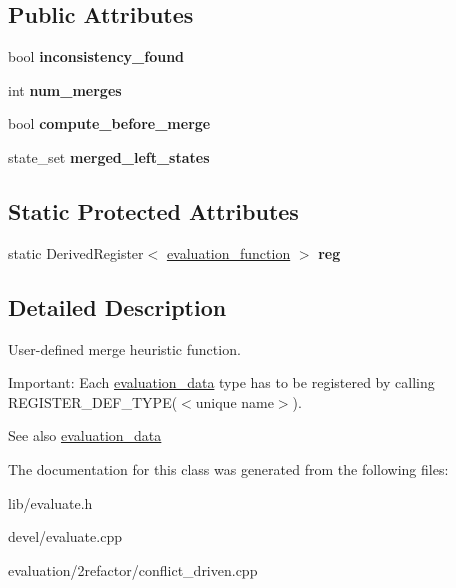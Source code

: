 \subsection*{Public Attributes}
\begin{DoxyCompactItemize}
\item 
bool {\bfseries inconsistency\+\_\+found}\hypertarget{classevaluation__function_a6631f0e603404c6c08c1a1fdd298932b}{}\label{classevaluation__function_a6631f0e603404c6c08c1a1fdd298932b}

\item 
int {\bfseries num\+\_\+merges}\hypertarget{classevaluation__function_a23fbdcc2f7a07e1d1428e61d5c5c267f}{}\label{classevaluation__function_a23fbdcc2f7a07e1d1428e61d5c5c267f}

\item 
bool {\bfseries compute\+\_\+before\+\_\+merge}\hypertarget{classevaluation__function_a1954a2b161d4da6148e288cb38ac8b59}{}\label{classevaluation__function_a1954a2b161d4da6148e288cb38ac8b59}

\item 
state\+\_\+set {\bfseries merged\+\_\+left\+\_\+states}\hypertarget{classevaluation__function_aff00baf1529b16519900b0f68afe8dad}{}\label{classevaluation__function_aff00baf1529b16519900b0f68afe8dad}

\end{DoxyCompactItemize}
\subsection*{Static Protected Attributes}
\begin{DoxyCompactItemize}
\item 
static Derived\+Register$<$ \hyperlink{classevaluation__function}{evaluation\+\_\+function} $>$ {\bfseries reg}\hypertarget{classevaluation__function_a254a3ccfbe2bdd5c9b84ad4e52599e50}{}\label{classevaluation__function_a254a3ccfbe2bdd5c9b84ad4e52599e50}

\end{DoxyCompactItemize}


\subsection{Detailed Description}
User-\/defined merge heuristic function. 

Important\+: Each \hyperlink{classevaluation__data}{evaluation\+\_\+data} type has to be registered by calling R\+E\+G\+I\+S\+T\+E\+R\+\_\+\+D\+E\+F\+\_\+\+T\+Y\+P\+E($<$unique name$>$). \begin{DoxySeeAlso}{See also}
\hyperlink{classevaluation__data}{evaluation\+\_\+data} 
\end{DoxySeeAlso}


The documentation for this class was generated from the following files\+:\begin{DoxyCompactItemize}
\item 
lib/evaluate.\+h\item 
devel/evaluate.\+cpp\item 
evaluation/2refactor/conflict\+\_\+driven.\+cpp\end{DoxyCompactItemize}
